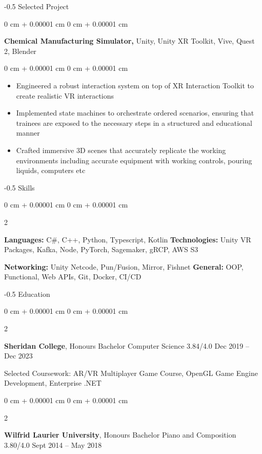 \documentclass[10pt, letterpaper]{article}
\makeatletter
\newenvironment{highlights}{
    \begin{itemize}[
        topsep=0.10 cm,
        parsep=0.10 cm,
        partopsep=0pt,
        itemsep=0pt,
        leftmargin=0 cm + 10pt
    ]
}{
    \end{itemize}
} %
\newenvironment{onecolentry}{
    \begin{adjustwidth}{
        0 cm + 0.00001 cm
    }{
        0 cm + 0.00001 cm
    }
}{
    \end{adjustwidth}
} %
\newenvironment{twocolentryb}[2][]{
    \onecolentry
    \def\secondColumn{#2}
    \setcolumnwidth{\fill, 10 cm}
    \begin{paracol}{2}
}{
    \switchcolumn \raggedleft \secondColumn
    \end{paracol}
    \endonecolentry
} %
\newenvironment{twocolentry}[2][]{
    \onecolentry
    \def\secondColumn{#2}
    \setcolumnwidth{\fill, 4.5 cm}
    \begin{paracol}{2}
}{
    \switchcolumn \raggedleft \secondColumn
    \end{paracol}
    \endonecolentry
} %
\renewcommand{\section}{%
  \@startsection{section}{1}{0mm}%
  {-\baselineskip}{0.5\baselineskip}%
  {\normalfont\Large\bfseries\color{myBlue}}%
}
\makeatother
\begin{document}
    \section{Selected Project}
        \begin{onecolentry}
        \textbf{Chemical Manufacturing Simulator,} Unity, Unity XR Toolkit, Vive, Quest 2, Blender 
        \end{onecolentry}

        \vspace{0.10 cm}
        \begin{onecolentry}
            \begin{highlights}
                \item Engineered a robust interaction system on top of XR Interaction Toolkit to create realistic VR interactions 
                \item Implemented state machines to orchestrate ordered scenarios, ensuring that trainees are exposed to the necessary steps in a structured and educational manner
                \item  Crafted immersive 3D scenes that accurately replicate the working environments including accurate equipment with working controls, pouring liquids, computers etc
            \end{highlights}
        \end{onecolentry}

    \section{Skills}
    \begin{twocolentryb}{
        \textbf{Networking:} Unity Netcode, Pun/Fusion, Mirror, Fishnet
        \textbf{General:} OOP, Functional, Web APIs, Git, Docker, CI/CD 
    }
        \textbf{Languages:} C\#, C++, Python, Typescript, Kotlin
        \textbf{Technologies:} Unity VR Packages, Kafka, Node, PyTorch, Sagemaker, gRCP, AWS S3
    \end{twocolentryb}

    \section{Education}
        \begin{twocolentry}{
            Dec 2019 – Dec 2023
        }
        \textbf{Sheridan College}, Honours Bachelor Computer Science 3.84/4.0\end{twocolentry}
        {Selected Coursework:} AR/VR Multiplayer Game Course, OpenGL Game Engine Development, Enterprise .NET 
        \vspace{0.10 cm}

        \begin{twocolentry}{
            Sept 2014 – May 2018
        }
       \vspace{0.10 cm}
        \textbf{Wilfrid Laurier University}, Honours Bachelor Piano and Composition 3.80/4.0\end{twocolentry}
        
\end{document}
